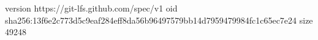 version https://git-lfs.github.com/spec/v1
oid sha256:13f6e2c773d5c9eaf284eff8da56b96497579bb14d7959479984fc1c65ec7e24
size 49248
